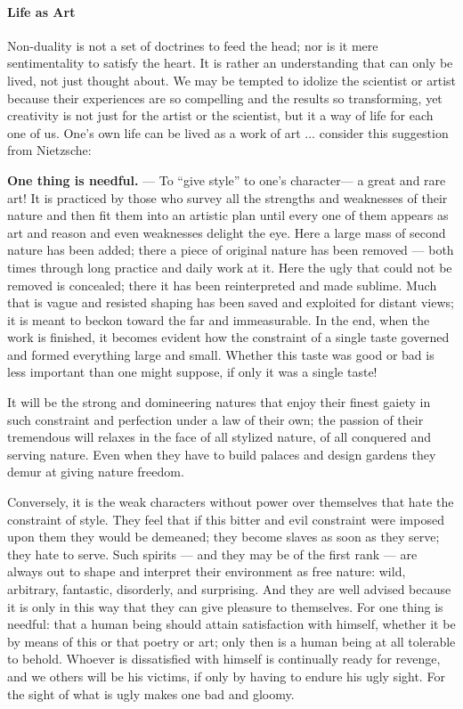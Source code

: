 \paragraph{Life as Art}


Non-duality is not a set of doctrines to feed the head; nor is it mere sentimentality to satisfy the heart. It is rather an understanding that can only be lived, not just thought about. We may be tempted to idolize the scientist or artist because their experiences are so compelling and the results so transforming, yet creativity is not just for the artist or the scientist, but it a way of life for each one of us. One's own life can be lived as a work of art ... consider this suggestion from Nietzsche:

\begin{quotationx}
\textbf{One thing is needful.} --- To ``give style'' to one's character--- a great and rare art! It is practiced by those who survey all the strengths and weaknesses of their nature and then fit them into an artistic plan until every one of them appears as art and reason and even weaknesses delight the eye. Here a large mass of second nature has been added; there a piece of original nature has been removed --- both times through long practice and daily work at it. Here the ugly that could not be removed is concealed; there it has been reinterpreted and made sublime. Much that is vague and resisted shaping has been saved and exploited for distant views; it is meant to beckon toward the far and immeasurable. In the end, when the work is finished, it becomes evident how the constraint of a single taste governed and formed everything large and small. Whether this taste was good or bad is less important than one might suppose, if only it was a single taste!

It will be the strong and domineering natures that enjoy their finest gaiety in such constraint and perfection under a law of their own; the passion of their tremendous will relaxes in the face of all stylized nature, of all conquered and serving nature. Even when they have to build palaces and design gardens they demur at giving nature freedom.

Conversely, it is the weak characters without power over themselves that hate the constraint of style. They feel that if this bitter and evil constraint were imposed upon them they would be demeaned; they become slaves as soon as they serve; they hate to serve. Such spirits --- and they may be of the first rank --- are always out to shape and interpret their environment as free nature: wild, arbitrary, fantastic, disorderly, and surprising. And they are well advised because it is only in this way that they can give pleasure to themselves. For one thing is needful: that a human being should attain satisfaction with himself, whether it be by means of this or that poetry or art; only then is a human being at all tolerable to behold. Whoever is dissatisfied with himself is continually ready for revenge, and we others will be his victims, if only by having to endure his ugly sight. For the sight of what is ugly makes one bad and gloomy.
\end{quotationx}




